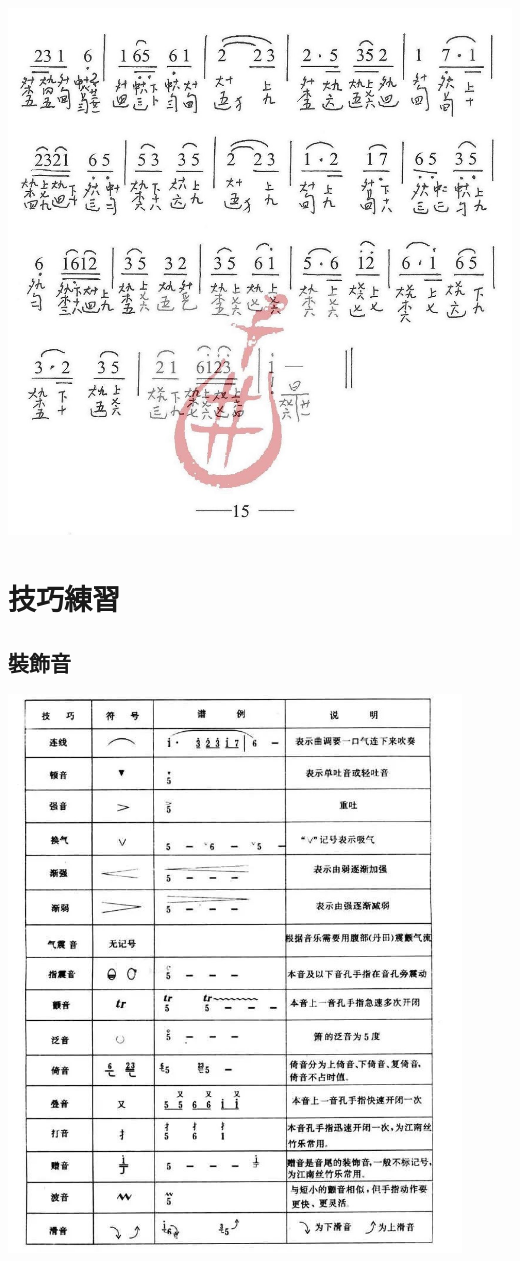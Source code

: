 \documentclass[cn,pad,twocol]{elegantbook}
\begin{document}
\paragraph*{\includegraphics[width=\textwidth]{mudanting/2021-牡丹亭-15回生}} 
               
\chapter{技巧練習}
\section{裝飾音}                \includegraphics[width=0.9\textwidth]{dongxiao/20201231-裝飾音}
\end{document}
